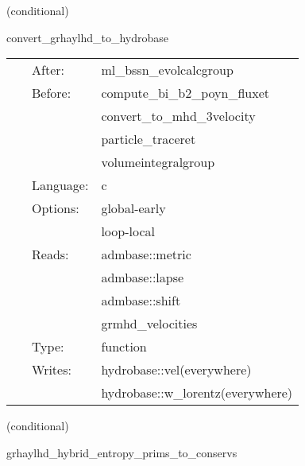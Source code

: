 \documentclass{article}
\begin{document}
\vspace{5mm}

   (conditional) 

\hspace{5mm} convert\_grhaylhd\_to\_hydrobase 

\hspace{5mm}{\it convert grhaylhd-native variables to hydrobase } 


\hspace{5mm}

 \begin{tabular*}{160mm}{cll} 
~ & After:  & ml\_bssn\_evolcalcgroup \\ 
~ & Before:  & compute\_bi\_b2\_poyn\_fluxet \\ 
~& ~ &convert\_to\_mhd\_3velocity\\ 
~& ~ &particle\_traceret\\ 
~& ~ &volumeintegralgroup\\ 
~ & Language:  & c \\ 
~ & Options:  & global-early \\ 
~& ~ &loop-local\\ 
~ & Reads:  & admbase::metric \\ 
~& ~ &admbase::lapse\\ 
~& ~ &admbase::shift\\ 
~& ~ &grmhd\_velocities\\ 
~ & Type:  & function \\ 
~ & Writes:  & hydrobase::vel(everywhere) \\ 
~& ~ &hydrobase::w\_lorentz(everywhere)\\ 
\end{tabular*} 


\vspace{5mm}

   (conditional) 

\hspace{5mm} grhaylhd\_hybrid\_entropy\_prims\_to\_conservs 

\hspace{5mm}{\it entropy+hybrid version of grhaylhd\_prims\_to\_conservs } 


\hspace{5mm}
\end{document}
